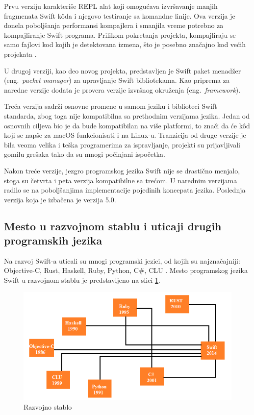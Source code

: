 \documentclass[a4paper]{article}
\begin{document}
Prvu verziju karakteriše REPL alat koji omogućava izvršavanje  manjih fragmenata Swift k\^{o}da i njegovo testiranje sa komandne linije. Ova verzija je donela poboljšanja performansi kompajlera i smanjila vreme potrebno za kompajliranje Swift programa. Prilikom pokretanja projekta, kompajliraju se samo fajlovi kod kojih je detektovana izmena, što je posebno značajno kod većih projekata \cite{swiftdev_sajt}. 

U drugoj verziji, kao deo novog projekta, predstavljen je Swift paket menadžer (eng.~{\em packet manager}) za upravljanje Swift bibliotekama. Kao priprema za naredne verzije dodata je provera verzije izvršnog okruženja (eng.~{\em framework}). 

Treća verzija sadrži osnovne promene u samom jeziku i biblioteci Swift standarda, zbog toga nije kompatibilna sa prethodnim verzijama jezika. Jedan od osnovnih ciljeva bio je da bude kompatibilan na više platformi, to znači da će k\^{o}d koji se napše za macOS funkcionisati i na Linux-u. Tranzicija od druge verzije je bila veoma velika i teška programerima za ispravljanje, projekti su prijavljivali gomilu grešaka tako da su mnogi počinjani ispočetka. 

Nakon treće verzije, jezgro programskog jezika Swift nije se drastično menjalo, stoga su četvrta i peta verzija kompatibilne sa trećom. U narednim verzijama radilo se na poboljšanjima implementacije pojedinih koncepata jezika. Poslednja verzija koja je izbačena je verzija 5.0.
  
\subsection{Mesto u razvojnom stablu i uticaji drugih programskih jezika}
\label{subsec:podnaslovRazvojnoStablo}
Na razvoj Swift-a uticali su mnogi programski jezici, od kojih su najznačajniji: Objective-C, Rust, Haskell, Ruby, Python, C\#, CLU \cite{chris_sajt}. Mesto programskog jezika Swift u razvojnom stablu je predstavljeno na slici \ref{fig:razvojno_stablo}.

\begin{figure}[h!]
\begin{center}
\includegraphics[scale=0.5]{razvojno_stablo.png}
\end{center}
\caption{Razvojno stablo}
\label{fig:razvojno_stablo}
\end{figure}
\end{document}

